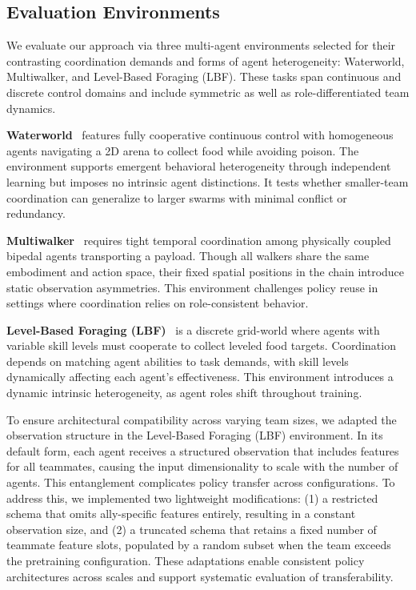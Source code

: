 \documentclass{article}
\begin{document}
\subsection{Evaluation Environments} 

We evaluate our approach via three multi-agent environments selected for their contrasting 
coordination demands and forms of agent heterogeneity: 
Waterworld, Multiwalker, and Level-Based Foraging (LBF). These tasks span continuous 
and discrete control domains and include symmetric as well as role-differentiated team dynamics.

\textbf{Waterworld}~\cite{gupta2017} features fully cooperative continuous control 
with homogeneous agents navigating a 2D arena to collect food while avoiding poison. 
The environment supports emergent behavioral heterogeneity through independent learning 
but imposes no intrinsic agent distinctions. It tests whether smaller-team coordination 
can generalize to larger swarms with minimal conflict or redundancy.

\textbf{Multiwalker}~\cite{gupta2017} requires tight temporal coordination among physically 
coupled bipedal agents transporting a payload. Though all walkers share the same embodiment 
and action space, their fixed spatial positions in the chain introduce static observation 
asymmetries. This environment challenges policy reuse in settings where coordination relies 
on role-consistent behavior.

\textbf{Level-Based Foraging (LBF)}~\cite{papoudakis2021} is a discrete grid-world where 
agents with variable skill levels must cooperate to collect leveled food targets. 
Coordination depends on matching agent abilities to task demands, with skill levels 
dynamically affecting each agent's effectiveness. This environment introduces a dynamic 
intrinsic heterogeneity, as agent roles shift throughout training.

To ensure architectural compatibility across varying team sizes, we adapted the observation 
structure in the Level-Based Foraging (LBF) environment. In its default form, 
each agent receives a structured observation that includes features for all teammates, 
causing the input dimensionality to scale with the number of agents. 
This entanglement complicates policy transfer across configurations. 
To address this, we implemented two lightweight modifications: 
(1) a restricted schema that omits ally-specific features entirely, 
resulting in a constant observation size, and 
(2) a truncated schema that retains a fixed number of teammate feature slots, 
populated by a random subset when the team exceeds the pretraining configuration. 
These adaptations enable consistent policy architectures across scales and support 
systematic evaluation of transferability.
\end{document}
